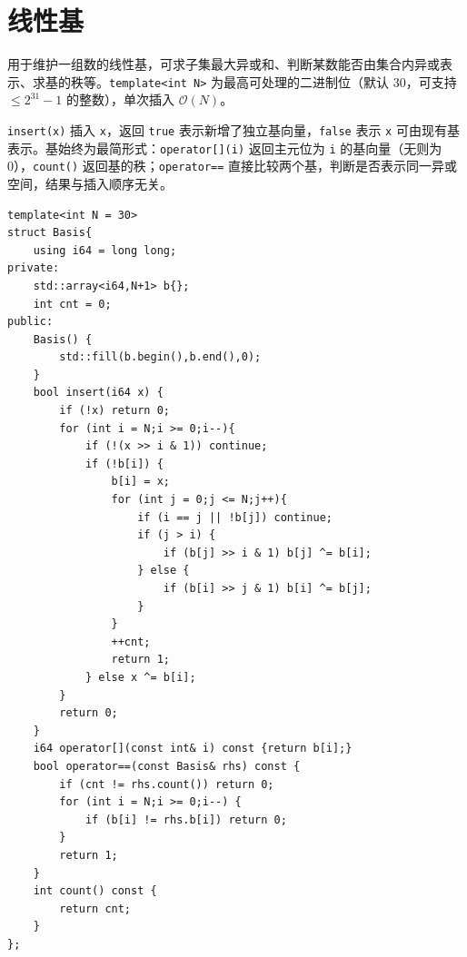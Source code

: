 \section{线性基}

用于维护一组数的线性基，可求子集最大异或和、判断某数能否由集合内异或表示、求基的秩等。\texttt{template<int N>} 为最高可处理的二进制位（默认 30，可支持 $\le 2^{31}-1$ 的整数），单次插入 $\mathcal{O}(N)$。

\texttt{insert(x)} 插入 \texttt{x}，返回 \texttt{true} 表示新增了独立基向量，\texttt{false} 表示 \texttt{x} 可由现有基表示。基始终为最简形式：\texttt{operator[](i)} 返回主元位为 \texttt{i} 的基向量（无则为 0），\texttt{count()} 返回基的秩；\texttt{operator==} 直接比较两个基，判断是否表示同一异或空间，结果与插入顺序无关。

\begin{lstlisting}
template<int N = 30>
struct Basis{
    using i64 = long long;
private:
    std::array<i64,N+1> b{};
    int cnt = 0;
public:
    Basis() {
        std::fill(b.begin(),b.end(),0);
    }
    bool insert(i64 x) {
        if (!x) return 0;
        for (int i = N;i >= 0;i--){
            if (!(x >> i & 1)) continue;
            if (!b[i]) {
                b[i] = x;
                for (int j = 0;j <= N;j++){
                    if (i == j || !b[j]) continue;
                    if (j > i) {
                        if (b[j] >> i & 1) b[j] ^= b[i];
                    } else {
                        if (b[i] >> j & 1) b[i] ^= b[j];
                    }
                }
                ++cnt;
                return 1;
            } else x ^= b[i];
        }
        return 0;
    }
    i64 operator[](const int& i) const {return b[i];}
    bool operator==(const Basis& rhs) const {
        if (cnt != rhs.count()) return 0;
        for (int i = N;i >= 0;i--) {
            if (b[i] != rhs.b[i]) return 0;
        }
        return 1;
    }
    int count() const {
        return cnt;
    }
};
\end{lstlisting}
